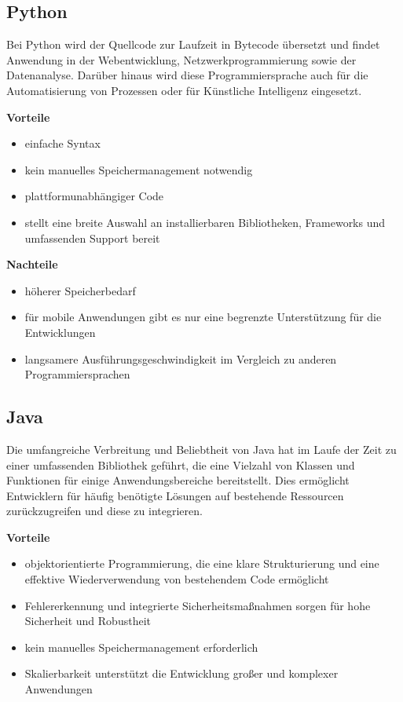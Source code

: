 \subsection{Python}
Bei Python wird der Quellcode zur Laufzeit in Bytecode übersetzt und findet Anwendung in der Webentwicklung, Netzwerkprogrammierung sowie der Datenanalyse. Darüber hinaus wird diese Programmiersprache auch für die Automatisierung von Prozessen oder für Künstliche Intelligenz eingesetzt. \parencite{Programmiersprachen}


\textbf{Vorteile}
\begin{itemize}
	\item einfache Syntax
	\item kein manuelles Speichermanagement notwendig
	\item plattformunabhängiger Code
	\item stellt eine breite Auswahl an installierbaren Bibliotheken, Frameworks und umfassenden Support bereit
\end{itemize}

\textbf{Nachteile}
\begin{itemize}
	\item höherer Speicherbedarf
	\item für mobile Anwendungen gibt es nur eine begrenzte Unterstützung für die Entwicklungen
	\item langsamere Ausführungsgeschwindigkeit im Vergleich zu anderen Programmiersprachen
\end{itemize}

\subsection{Java}
Die umfangreiche Verbreitung und Beliebtheit von Java hat im Laufe der Zeit zu einer umfassenden Bibliothek geführt, die eine Vielzahl von Klassen und Funktionen für einige Anwendungsbereiche bereitstellt. Dies ermöglicht Entwicklern für häufig benötigte Lösungen auf bestehende Ressourcen zurückzugreifen und diese zu integrieren. \parencite{Programmiersprachen}

\textbf{Vorteile}
\begin{itemize}
	\item objektorientierte Programmierung, die eine klare Strukturierung und eine effektive Wiederverwendung von bestehendem Code ermöglicht
	\item Fehlererkennung und integrierte Sicherheitsmaßnahmen sorgen für hohe Sicherheit und Robustheit
	\item kein manuelles Speichermanagement erforderlich
	\item Skalierbarkeit unterstützt die Entwicklung großer und komplexer Anwendungen
\end{itemize}


